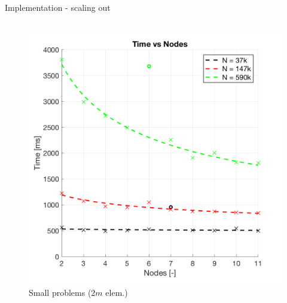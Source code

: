 \documentclass[c]{beamer}
\begin{document}

\begin{frame}{Implementation - scaling out}

\begin{columns}
  \begin{column}{0.5\textwidth}
  \begin{figure}
      \centering
      \includegraphics[width=1\textwidth]{img/TotalTimeVsNodeCount_SMALL.png}
      \caption{\tiny Small problems ($2m$ elem.)}
    \end{figure}
  \end{column}


\end{columns}
\end{frame}
\end{document}
